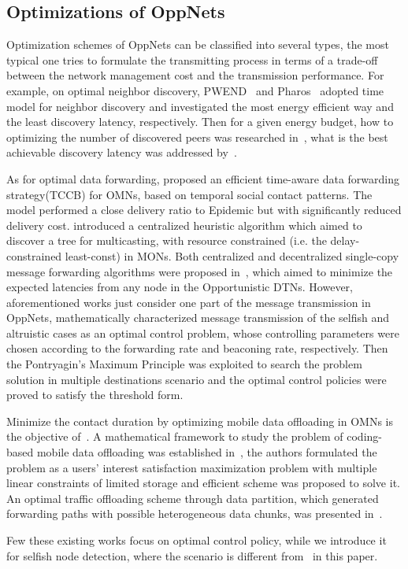 \subsection{Optimizations of OppNets}
Optimization schemes of OppNets can be classified into
several types, the most typical one tries to formulate
the transmitting process in terms of a trade-off between
the network management cost and the transmission performance.
For example, on optimal neighbor discovery,
PWEND~\cite{DBLP:journals/adhoc/ChenQLLWYL20} and
Pharos~\cite{DBLP:conf/secon/Zhu00L19} adopted time model
for neighbor discovery and investigated the most energy efficient way
and the least discovery latency, respectively.
Then for a given energy budget,
how to optimizing the number of discovered peers was researched
in~\cite{DBLP:journals/tmc/LoretiB20},
what is the best achievable discovery latency was addressed
by~\cite{DBLP:conf/sigcomm/KindtC19}.

As for optimal data forwarding,
\cite{DBLP:journals/tvt/ZhouLZXF17} proposed an
efficient time-aware data forwarding strategy(TCCB) for OMNs,
 based on temporal social contact patterns.
 The model performed a close delivery ratio to
 Epidemic but with significantly reduced delivery cost.
\cite{DBLP:journals/tvt/LiuWXWLY17} introduced
a centralized heuristic algorithm
which aimed to discover a tree for multicasting,
with resource constrained (i.e. the delay-constrained least-const) in MONs.
Both centralized and decentralized single-copy message forwarding algorithms
were proposed in~\cite{DBLP:journals/tsipn/ShaghaghianC15},
which aimed to minimize the expected latencies
from any node in the Opportunistic DTNs.
However, aforementioned works just consider one part of
the message transmission in OppNets,
\cite{DBLP:journals/tcss/WuDH18} mathematically characterized
message transmission of the selfish
and altruistic cases as an optimal control problem,
whose controlling parameters were chosen according
to the forwarding rate and beaconing rate, respectively.
Then the Pontryagin's Maximum Principle was exploited
to search the problem solution in multiple destinations scenario
and the optimal control policies were proved to satisfy the threshold form.

Minimize the contact duration by optimizing
mobile data offloading in OMNs is the objective
of~\cite{DBLP:journals/tits/LiJWZ014,DBLP:conf/icc/WangW18}.
A mathematical framework to study the problem of
coding-based mobile data offloading
was established in~\cite{DBLP:journals/tits/LiJWZ014},
the authors formulated the problem as a users' interest
satisfaction maximization problem
with multiple linear constraints of
limited storage and efficient scheme
was proposed to solve it.
An optimal traffic offloading scheme through
data partition, which generated forwarding paths
with possible heterogeneous data chunks,
was presented in~\cite{DBLP:conf/icc/WangW18}.

Few these existing works focus on
optimal control policy, while we introduce it
for selfish node detection,
where the scenario is different from~\cite{DBLP:journals/tcss/WuDH18} in this paper.
